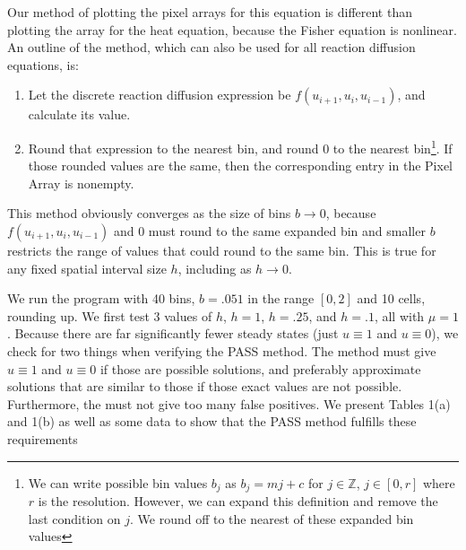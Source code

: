 \documentclass[11pt]{article}
\begin{document}
Our method of plotting the pixel arrays for this equation is different than plotting the array for the heat equation, because the Fisher equation is nonlinear. An outline of the method, which can also be used for all reaction diffusion equations, is:

\begin{enumerate}
    \item Let the discrete reaction diffusion expression be $f(u_{i+1}, u_i, u_{i-1})$, and calculate its value.
    \item  Round that expression to the nearest bin, and round 0 to the nearest bin\footnote{We can write possible bin values $b_j$ as $b_j = mj + c$ for $j \in \mathbb{Z}$, $j \in [0,r]$ where $r$ is the resolution. However, we can expand this definition and remove the last condition on $j$. We round off to the nearest of these expanded bin values}. If those rounded values are the same, then the corresponding entry in the Pixel Array is nonempty.
\end{enumerate}

This method obviously converges as the size of bins $b \rightarrow 0$, because $f(u_{i+1}, u_i, u_{i-1})$ and 0 must round to the same expanded bin and smaller $b$ restricts the range of values that could round to the same bin. This is true for any fixed spatial interval size $h$, including as $h \rightarrow 0$.

We run the program with 40 bins, $b = .051$ in the range $[0,2]$ and 10 cells, rounding up. We first test 3 values of $h$, $h = 1$, $h = .25$, and $h = .1$, all with $\mu = 1$. Because there are far significantly fewer steady states (just $u \equiv 1$ and $u \equiv 0$), we check for two things when verifying the PASS method. The method must give $u \equiv 1$ and $u \equiv 0$ if those are possible solutions, and preferably approximate solutions that are similar to those if those exact values are not possible. Furthermore, the must not give too many false positives. We present Tables 1(a) and 1(b) as well as some data to show that the PASS method fulfills these requirements

\begin{comment}
\footnote{Ok, does it?}.
\end{comment}
\end{document}

